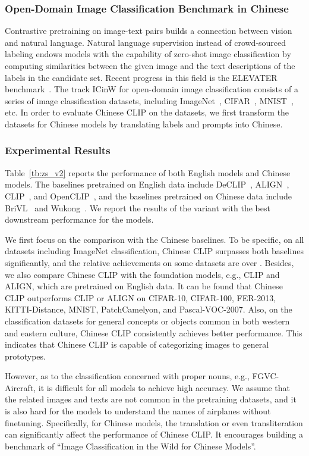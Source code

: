 \documentclass[11pt]{article}
\begin{document}
\subsubsection{Open-Domain Image Classification Benchmark in Chinese}
Contrastive pretraining on image-text pairs builds a connection between vision and natural language. Natural language supervision instead of crowd-sourced labeling endows models with the capability of zero-shot image classification by computing similarities between the given image and the text descriptions of the labels in the candidate set. 
Recent progress in this field is the ELEVATER benchmark~\citep{elevater}. 
The track ICinW for open-domain image classification consists of a series of image classification datasets, including ImageNet~\citep{imagenet}, CIFAR~\citep{cifar}, MNIST~\citep{mnist}, etc.
In order to evaluate Chinese CLIP on the datasets, we first transform the datasets for Chinese models by translating labels and prompts into Chinese. 


\subsubsection{Experimental Results}
Table~\ref{tb:zs_v2} reports the performance of both English models and Chinese models. 
The baselines pretrained on English data include DeCLIP~\citep{declip}, ALIGN~\citep{align}, CLIP~\citep{clip}, and OpenCLIP~\citep{openclip}, and the baselines pretrained on Chinese data include BriVL~\citep{wenlan} and Wukong~\citep{wukong}. 
We report the results of the variant with the best downstream performance for the models. 

We first focus on the comparison with the Chinese baselines. 
To be specific, on all datasets including ImageNet classification, Chinese CLIP surpasses both baselines significantly, and the relative achievements on some datasets are over . 
Besides, we also compare Chinese CLIP with the foundation models, e.g., CLIP and ALIGN, which are pretrained on English data. 
It can be found that Chinese CLIP outperforms CLIP or ALIGN on CIFAR-10, CIFAR-100, FER-2013, KITTI-Distance, MNIST, PatchCamelyon, and Pascal-VOC-2007. 
Also, on the classification datasets for general concepts or objects common in both western and eastern culture, Chinese CLIP consistently achieves better performance. 
This indicates that Chinese CLIP is capable of categorizing images to general prototypes. 

However, as to the classification concerned with proper nouns, e.g., FGVC-Aircraft, it is difficult for all models to achieve high accuracy. 
We assume that the related images and texts are not common in the pretraining datasets, and it is also hard for the models to understand the names of airplanes without finetuning. 
Specifically, for Chinese models, the translation or even transliteration can significantly affect the performance of Chinese CLIP. It encourages building a benchmark of ``Image Classification in the Wild for Chinese Models''. 
\end{document}
